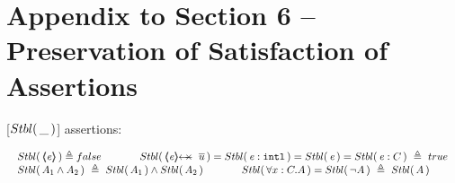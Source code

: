 \section{Appendix to Section 6 -- Preservation of Satisfaction of Assertions}
\label{app:preserve}

\begin{definition}
\label{def:Basic}
[${Stbl(\, \_\, )}$] assertions: %

$
\begin{array}{l}
 \begin{array}{lll}
  \Stable {\inside{\re}}  \triangleq  false & \lclSPACE &   \Stable {\protectedFrom \re {\overline {u}}} =  
  \Stable  {\internal \re} =  %
    \Stable {\re}=   
     \Stable {\re:C}\   \triangleq \    true
 \end{array}
  \\
 \begin{array}{lcl}
 \Stable  {A_1  \wedge  A_2}\  \triangleq\     \Stable  { A_1}  \wedge    \Stable  {A_2}    &
\lclSPACE  &  
 \Stable  {\forall x:C.A} =\Stable  {\neg A} \   \triangleq\   \Stable A
 \end{array}
 \end{array}
$
\label{f:Basic}
 \end{definition}


